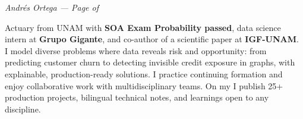 \documentclass[10pt, letterpaper]{awesome-cv}
\renewcommand{\acvSectionContentTopSkip}{0.3mm}
\renewenvironment{cvparagraph}{%
  \vspace{\acvSectionContentTopSkip}%
  \vspace{-3mm}%
  \paragraphstyle%
}{%
  \par%
  \vspace{0.3mm}%
}
\renewcommand*{\paragraphstyle}{\fontsize{8.5pt}{1.15em}\bodyfontlight\upshape\color{text}}
\begin{document}
\makecvheader[C]


\makecvfooter
  {}
  {\color{lightgray}\textit{\small Andrés Ortega — Page \thepage{} of \pageref*{LastPage}}}
  {}


\begin{cvparagraph}
Actuary from UNAM with \textbf{SOA Exam Probability passed}, data science intern at \textbf{Grupo Gigante}, and co-author of a scientific paper at \textbf{IGF-UNAM}. I model diverse problems where data reveals risk and opportunity: from predicting customer churn to detecting invisible credit exposure in graphs, with explainable, production-ready solutions. I practice continuing formation and enjoy collaborative work with multidisciplinary teams. On my  I publish 25+ production projects, bilingual technical notes, and learnings open to any discipline.
\end{cvparagraph}

\end{document}
